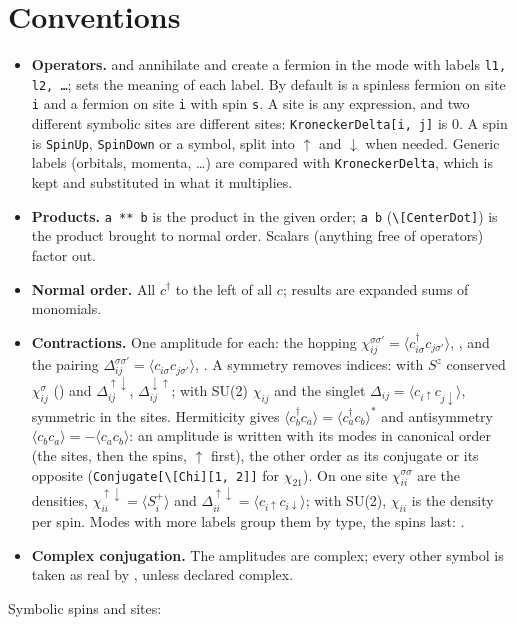 \documentclass[11pt,a4paper]{article}
\begin{document}
\section{Conventions}
\begin{itemize}
\item \textbf{Operators.}  and  annihilate and create a fermion in the mode
  with labels \texttt{l1, l2, \dots};  sets the meaning of each label. By default  is a
  spinless fermion on site \texttt{i} and  a fermion on site \texttt{i} with spin \texttt{s}. A site is any
  expression, and two different symbolic sites are different sites: \texttt{KroneckerDelta[i, j]} is $0$. A spin is
  \texttt{SpinUp}, \texttt{SpinDown} or a symbol, split into $\uparrow$ and $\downarrow$ when needed. Generic labels (orbitals,
  momenta, \dots) are compared with \texttt{KroneckerDelta}, which is kept and substituted in what it multiplies.
\item \textbf{Products.} \texttt{a ** b} is the product in the given order; \texttt{a \textperiodcentered{} b} (\texttt{\textbackslash[CenterDot]})
  is the product brought to normal order. Scalars (anything free of operators) factor out.
\item \textbf{Normal order.} All $c^\dagger$ to the left of all $c$; results are expanded sums of monomials.
\item \textbf{Contractions.} One amplitude for each: the hopping $\chi^{\sigma\sigma'}_{ij}=\langle c^\dagger_{i\sigma}c_{j\sigma'}\rangle$,
  \fn{\textbackslash[Chi][i, j, s, t]}, and the pairing $\Delta^{\sigma\sigma'}_{ij}=\langle c_{i\sigma}c_{j\sigma'}\rangle$,
  \fn{\textbackslash[CapitalDelta][i, j, s, t]}. A symmetry removes indices: with $S^z$ conserved $\chi^\sigma_{ij}$
  (\fn{\textbackslash[Chi][i, j, s]}) and $\Delta^{\uparrow\downarrow}_{ij}$, $\Delta^{\downarrow\uparrow}_{ij}$; with SU(2) $\chi_{ij}$ and the
  singlet $\Delta_{ij}=\langle c_{i\uparrow}c_{j\downarrow}\rangle$, symmetric in the sites. Hermiticity gives
  $\langle c^\dagger_bc_a\rangle=\langle c^\dagger_ac_b\rangle^*$ and antisymmetry $\langle c_bc_a\rangle=-\langle c_ac_b\rangle$: an amplitude is written
  with its modes in canonical order (the sites, then the spins, $\uparrow$ first), the other order as its conjugate or its
  opposite (\texttt{Conjugate[\textbackslash[Chi][1, 2]]} for $\chi_{21}$). On one site $\chi^{\sigma\sigma}_{ii}$ are the densities,
  $\chi^{\uparrow\downarrow}_{ii}=\langle S^+_i\rangle$ and $\Delta^{\uparrow\downarrow}_{ii}=\langle c_{i\uparrow}c_{i\downarrow}\rangle$; with SU(2), $\chi_{ii}$ is the
  density per spin. Modes with more labels group them by type, the spins last: \fn{\textbackslash[Chi][i, j, o, o', s, t]}.
\item \textbf{Complex conjugation.} The amplitudes are complex; every other symbol is taken as real by , unless
  declared complex.
\end{itemize}
Symbolic spins and sites:
\end{document}
